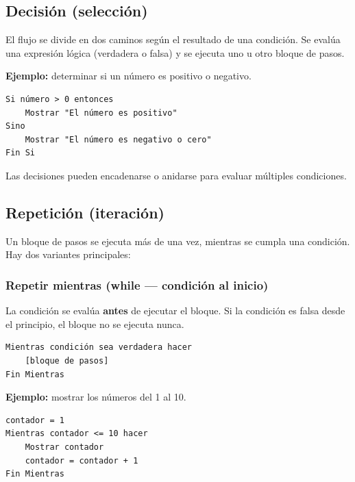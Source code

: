 \subsection{Decisión (selección)}

El flujo se divide en dos caminos según el resultado de una condición. Se evalúa una expresión lógica (verdadera o falsa) y se ejecuta uno u otro bloque de pasos.


\textbf{Ejemplo:} determinar si un número es positivo o negativo.

\begin{lstlisting}[style=estilo-pseudocode]
Si número > 0 entonces
    Mostrar "El número es positivo"
Sino
    Mostrar "El número es negativo o cero"
Fin Si
\end{lstlisting}

Las decisiones pueden encadenarse o anidarse para evaluar múltiples condiciones.

\subsection{Repetición (iteración)}

Un bloque de pasos se ejecuta más de una vez, mientras se cumpla una condición. Hay dos variantes principales:

\subsubsection{Repetir mientras (while --- condición al inicio)}

La condición se evalúa \textbf{antes} de ejecutar el bloque. Si la condición es falsa desde el principio, el bloque no se ejecuta nunca.


\begin{lstlisting}[style=estilo-pseudocode]
Mientras condición sea verdadera hacer
    [bloque de pasos]
Fin Mientras
\end{lstlisting}

\textbf{Ejemplo:} mostrar los números del 1 al 10.
\begin{lstlisting}[style=estilo-pseudocode]
contador = 1
Mientras contador <= 10 hacer
    Mostrar contador
    contador = contador + 1
Fin Mientras
\end{lstlisting}

